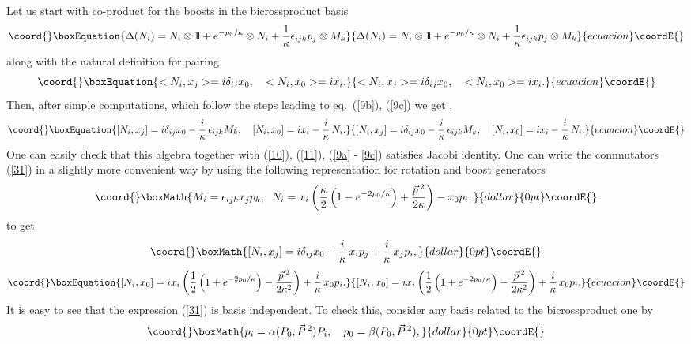 \documentclass [prd,twocolumn,nofootinbib,showpacs]  {revtex4}
\def\bbbone{{\mathchoice {\rm 1\mskip-4mu l} {\rm 1\mskip-4mu l}
{\rm 1\mskip-4.5mu l} {\rm 1\mskip-5mu l}}}
\begin{document}
Let us start with co-product for the boosts in the bicrossproduct basis
\begin{equation}\coord{}\boxEquation{\label{29}
 \Delta(N_{i}) = N_{i}\otimes \bbbone  +
e^{-{p_{0}/ \kappa}}\otimes N_{i} + {1\over \kappa}
\epsilon_{ijk}p_{j}\otimes M_{k}
}{\Delta(N_{i}) = N_{i}\otimes \bbbone  +
e^{-{p_{0}/ \kappa}}\otimes N_{i} + {1\over \kappa}
\epsilon_{ijk}p_{j}\otimes M_{k}
}{ecuacion}\coordE{}\end{equation}
along with the natural definition for pairing
\begin{equation}\coord{}\boxEquation{\label{30}
<N_i, x_j> = i \delta_{ij} x_0, \quad <N_i, x_0> = i  x_i.
}{<N_i, x_j> = i \delta_{ij} x_0, \quad <N_i, x_0> = i  x_i.
}{ecuacion}\coordE{}\end{equation}
Then, after simple computations, which follow the steps leading to
eq.~(\ref{9b}), (\ref{9c})  we get \cite{luno}, \cite{lukps}
\begin{equation}\coord{}\boxEquation{\label{31}
[N_i, x_j] = i \delta_{ij} x_0 - \frac{i}\kappa\, \epsilon_{ijk} M_k, \quad [N_i, x_0] = i x_{i} - \frac{i}\kappa\, N_i.
}{[N_i, x_j] = i \delta_{ij} x_0 - \frac{i}\kappa\, \epsilon_{ijk} M_k, \quad [N_i, x_0] = i x_{i} - \frac{i}\kappa\, N_i.
}{ecuacion}\coordE{}\end{equation}
One can easily check that this algebra together with (\ref{10}),
(\ref{11}), (\ref{9a} - \ref{9c})  satisfies Jacobi identity. One
can write the commutators (\ref{31}) in a slightly more convenient
way by using the following representation for rotation and boost
generators
$$\coord{}\boxMath{
M_i = \epsilon_{ijk}x_jp_k, \;\; N_i =x_i \left(\frac\kappa2 \left(1-e^{-2p_0/\kappa}\right) +
\frac{\vec{p}\,{}^2}{2\kappa}\right) - x_0 p_i,
}{dollar}{0pt}\coordE{}$$
to get
$$\coord{}\boxMath{
[N_i, x_j] = i \delta_{ij} x_0 - \frac{i}\kappa\, x_i p_j + \frac{i}\kappa\, x_j p_i,
}{dollar}{0pt}\coordE{}$$
\begin{equation}\coord{}\boxEquation{\label{32}
 [N_i, x_0] =  i x_i \left(\frac12 \left(1+e^{-2p_0/\kappa}\right) -\frac{\vec{p}\,{}^2}{2\kappa^2}\right)
 + \frac{i}\kappa\,x_0 p_i.
}{[N_i, x_0] =  i x_i \left(\frac12 \left(1+e^{-2p_0/\kappa}\right) -\frac{\vec{p}\,{}^2}{2\kappa^2}\right)
 + \frac{i}\kappa\,x_0 p_i.
}{ecuacion}\coordE{}\end{equation}
It is easy to see that the expression (\ref{31}) is basis
independent. To check this, consider any  basis \coordHE{} related to the bicrossproduct one by
$$\coord{}\boxMath{
p_i = \alpha(P_0, \vec{P}\,{}^2) P_i, \quad p_0 = \beta(P_0, \vec{P}\,{}^2),
}{dollar}{0pt}\coordE{}$$
\end{document}
